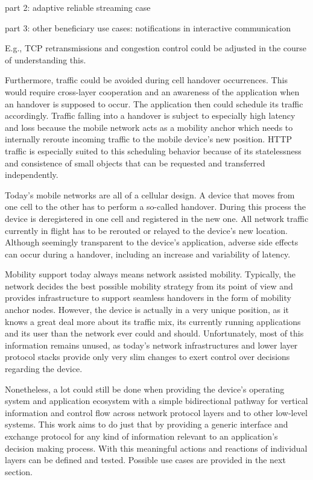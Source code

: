 part 2: adaptive reliable streaming case

part 3: other beneficiary use cases: notifications in interactive communication

 E.g., \gls{TCP} retransmissions and congestion control could be adjusted in the course of understanding this.

Furthermore, traffic could be avoided during cell handover occurrences. This would require cross-layer cooperation and an awareness of the application when an handover is supposed to occur. The application then could schedule its traffic accordingly. Traffic falling into a handover is subject to especially high latency and loss because the mobile network acts as a mobility anchor which needs to internally reroute incoming traffic to the mobile device's new position. \gls{HTTP} traffic is especially suited to this scheduling behavior because of its statelessness and consistence of small objects that can be requested and transferred independently.

Today's mobile networks are all of a cellular design. A device that moves from one cell to the other has to perform a so-called handover. During this process the device is deregistered in one cell and registered in the new one. All network traffic currently in flight has to be rerouted or relayed to the device's new location. 
Although seemingly transparent to the device's application, adverse side effects can occur during a handover, including an increase and variability of latency. 

Mobility support today always means network assisted mobility. Typically, the network decides the best possible mobility strategy from its point of view and provides infrastructure to support seamless handovers in the form of mobility anchor nodes. However, the device is actually in a very unique position, as it knows a great deal more about its traffic mix, its currently running applications and its user than the network ever could and should.
Unfortunately, most of this information remains unused, as today's network infrastructures and lower layer protocol stacks provide only very slim changes to exert control over decisions regarding the device.

Nonetheless, a lot could still be done when providing the device's operating system and application ecosystem with a simple bidirectional pathway for vertical information and control flow across network protocol layers and to other low-level systems. This work aims to do just that by providing a generic interface and exchange protocol for any kind of information relevant to an application's decision making process. With this meaningful actions and reactions of individual layers can be defined and tested. Possible use cases are provided in the next section.

